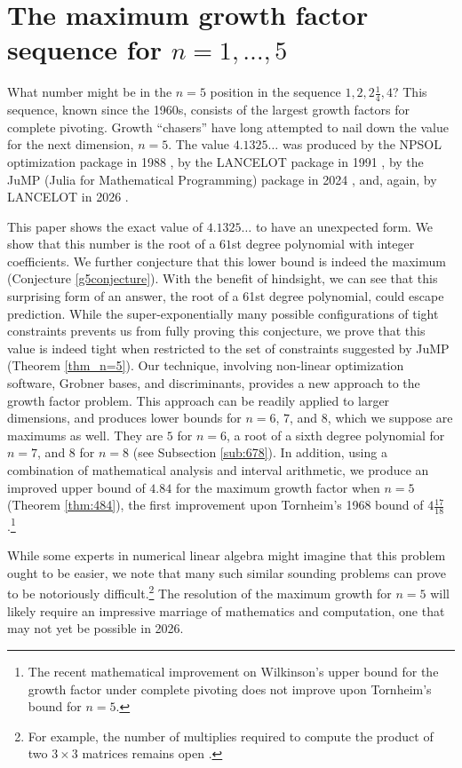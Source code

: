 \documentclass[reqno]{amsart}
\numberwithin{equation}{section}
\begin{document}
\section{The maximum growth factor sequence for $n=1,\ldots,5$}

What number might be in the $n=5$ position  in the sequence $1, 2, 2\tfrac{1}{4},4$?
This sequence, known since the 1960s, consists of the largest growth factors for complete pivoting. Growth ``chasers'' have long attempted to nail down the value for the next dimension, $n=5$. The value $4.1325\ldots$ was produced by the NPSOL optimization package in 1988  \cite{day1988growth}, by the LANCELOT package in 1991 \cite{gould1991growth}, by the JuMP (Julia for Mathematical Programming) package in 2024 \cite{edelman2024some}, and, again, by LANCELOT in 2026 \cite{gould2026}.

This paper shows the exact value of $4.1325\ldots$ to have an unexpected form. We show that this number is the root of a $61$st degree polynomial with integer coefficients. We further conjecture that this lower bound is indeed the maximum (Conjecture \ref{g5conjecture}). With the benefit of hindsight, we can see that this surprising form of an answer, the root of a 61st degree polynomial, could escape prediction. While the super-exponentially many possible configurations of tight constraints prevents us from fully proving this conjecture, we prove that this value is indeed tight when restricted to the set of constraints suggested by JuMP (Theorem \ref{thm_n=5}). Our technique, involving non-linear optimization software, Grobner bases, and discriminants, provides a new approach to the growth factor problem. This approach can be readily applied to larger dimensions, and produces lower bounds for $n = 6$, $7$, and $8$, which we suppose are maximums as well. They are $5$ for $n = 6$, a root of a sixth degree polynomial for $n =7$, and $8$ for $n = 8$ (see Subsection \ref{sub:678}). In addition, using a combination of mathematical analysis and interval arithmetic, we produce an improved upper bound of $4.84$ for the maximum growth factor when $n =5$ (Theorem \ref{thm:484}), the first improvement upon Tornheim's 1968 bound of $4 \tfrac{17}{18}$ \cite{tornheim1969maximum}.\footnote{The recent mathematical improvement \cite{bisain2025new} on Wilkinson's upper bound for the growth factor under complete pivoting does not improve upon Tornheim's bound for $n=5$.}


While some experts in numerical linear algebra might imagine that this problem ought to be easier, we note that many such similar sounding problems can prove to be notoriously difficult.\footnote{For example, the number of multiplies required to compute the product of two $3\times 3$ matrices remains open \cite{heule2021new}.} The resolution of the maximum growth for $n = 5$ will likely require an impressive marriage of mathematics and computation, one that may not yet be possible in 2026.
\end{document}
